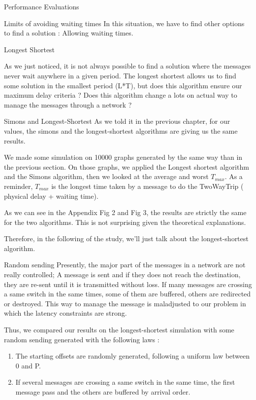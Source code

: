\documentclass[a4paper,10pt]{report}
\begin{document}
\begin{chapter}{Performance Evaluations}
\begin{section}{Limits of avoiding waiting times}
In this situation, we have to find other options to find a solution : Allowing waiting times.

\end{section}

\begin{section}{Longest Shortest}

As we just noticed, it is not always possible to find a solution where the messages never wait anywhere in a given period.
The longest shortest allows us to find some solution in the smallest period (L*T), but does this algorithm ensure our maximum delay criteria ?
Does this algorithm change a lots on actual way to manage the messages through a network ?

\begin{subsection}{Simons and Longest-Shortest}
As we told it in the previous chapter, for our values, the simons and the longest-shortest algorithms are giving us the same results.

We made some simulation on 10000 graphs generated by the same way than in the previous section.
On those graphs, we applied the Longest shortest algorithm and the Simons algorithm, then we looked at the average and worst $T_{max}$.
As a reminder, $T_{max}$ is the longest time taken by a message to do the TwoWayTrip ( physical delay + waiting time).

As we can see in the Appendix Fig 2 and Fig 3, the results are strictly the same for the two algorithms. This is not surprising given the
theoretical explanations.

Therefore, in the following of the study, we'll just talk about the longest-shortest algorithm.
\end{subsection}


\begin{subsection}{Random sending}
Presently, the major part of the messages in a network are not really controlled; A message is sent and if they does not reach the destination,
they are re-sent until it is transmitted without loss. If many messages are crossing a same switch in the same times, some of them are buffered,
others are redirected or destroyed. This way to manage the message is maladjusted to our problem in which the latency constraints are strong.

Thus, we compared our results on the longest-shortest simulation with some random sending generated with the following laws : 
\begin{enumerate}
 \item The starting offsets are randomly generated, following a uniform law between 0 and P.
 \item If several messages are crossing a same switch in the same time, the first message pass and the others are buffered by arrival order.
\end{enumerate}


\end{subsection}
\end{section}
\end{chapter}
\end{document}
